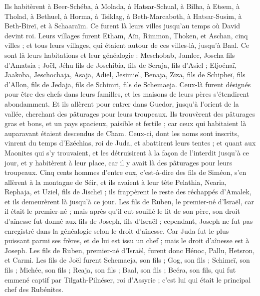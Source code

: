 \begin{multicols}{2}
Ils habitèrent à Beer-Schéba, à Molada, à Hatsar-Schual,
à Bilha, à Etsem, à Tholad,
à Bethuel, à Horma, à Tsiklag,
à Beth-Marcaboth, à Hatsar-Susim, à Beth-Bireï, et à Schaaraïm. Ce furent là leurs villes jusqu'au temps où David devint roi.
Leurs villages furent Etham, Aïn, Rimmon, Thoken, et Aschan, cinq villes ;
et tous leurs villages, qui étaient autour de ces villes-là, jusqu'à Baal. Ce sont là leurs habitations et leur généalogie :
Meschobab, Jamlec, Joscha fils d'Amatsia ;
Joël, Jéhu fils de Joschibia, fils de Seraja, fils d'Asiel ;
Eljoénaï, Jaakoba, Jeschochaja, Asaja, Adiel, Jesimiel, Benaja,
Ziza, fils de Schipheï, fils d'Allon, fils de Jedaja, fils de Schimri, fils de Schemaeja.
Ceux-là furent désignés pour être des chefs dans leurs familles, et les maisons de leurs pères s'étendirent abondamment.
Et ils allèrent pour entrer dans Guedor, jusqu'à l'orient de la vallée, cherchant des pâturages pour leurs troupeaux.
Ils trouvèrent des pâturages gras et bons, et un pays spacieux, paisible et fertile ; car ceux qui habitaient là auparavant étaient descendus de Cham.
Ceux-ci, dont les noms sont inscrits, vinrent du temps d'Ezéchias, roi de Juda, et abattirent leurs tentes ; et quant aux Maonites qui s'y trouvaient, et les détruisirent à la façon de l'interdit jusqu'à ce jour, et y habitèrent à leur place, car il y avait là des pâturages pour leurs troupeaux.
Cinq cents hommes d'entre eux, c'est-à-dire des fils de Siméon, s'en allèrent à la montagne de Séir, et ils avaient à leur tête Pelathia, Nearia, Rephaja, et Uziel, fils de Jischeï ;
ils frappèrent le reste des réchappés d'Amalek, et ils demeurèrent là jusqu'à ce jour.
\VerseOne{}Les fils de Ruben, le premier-né d'Israël, car il était le premier-né ; mais après qu'il eut souillé le lit de son père, son droit d'aînesse fut donné aux fils de Joseph, fils d'Israël ; cependant, Joseph ne fut pas enregistré dans la généalogie selon le droit d'aînesse.
Car Juda fut le plus puissant parmi ses frères, et de lui est issu un chef ; mais le droit d'aînesse est à Joseph.
Les fils de Ruben, premier-né d'Israël, furent donc Hénoc, Pallu, Hetsron, et Carmi.
Les fils de Joël furent Schemaeja, son fils ; Gog, son fils ; Schimeï, son fils ;
Michée, son fils ; Reaja, son fils ; Baal, son fils ;
Beéra, son fils, qui fut emmené captif par Tilgath-Pilnéser, roi d'Assyrie ; c'est lui qui était le principal chef des Rubénites.

\end{multicols}
